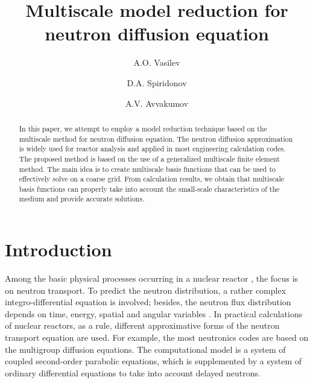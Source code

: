 \documentclass[runningheads]{llncs}
\begin{document}
%
\title{Multiscale model reduction for neutron diffusion equation}
%
%
\author{A.O. Vasilev \and 
D.A. Spiridonov \and
A.V. Avvakumov }
%
%
%
\maketitle              %
%
\begin{abstract}
In this paper, we attempt to employ a model reduction technique based on the multiscale method for neutron diffusion equation. 
The neutron diffusion approximation is widely used for reactor analysis and applied in most engineering calculation codes. 
The proposed method is based on the use of a generalized multiscale finite element method.
The main idea is to create multiscale basis functions that can be used to effectively solve on a coarse grid.
From calculation results, we obtain that multiscale basis functions can properly take into account the small-scale characteristics of the medium and provide accurate solutions. 

\end{abstract}

\section{Introduction}
Among the basic physical processes occurring in a nuclear reactor \cite{Duderstadt1976}, the focus is on neutron transport. 
To predict the neutron distribution, a rather complex integro-differential equation is involved; besides, the neutron flux distribution depends on time, energy, spatial and angular variables \cite{Stacey2007}.
In practical calculations of nuclear reactors, as a rule,  different approximative forms of the neutron transport equation are used. For example, the most neutronics codes are based on the multigroup diffusion equations.
The computational model is a system of coupled second-order parabolic equations, which is supplemented by a system of ordinary differential equations to take into account delayed neutrons.
\end{document}
